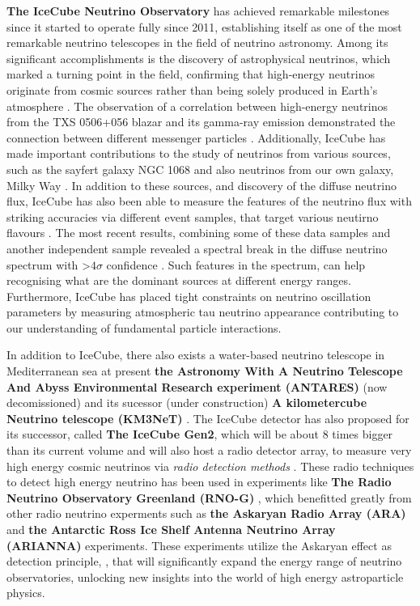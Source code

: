 \textbf{The IceCube Neutrino Observatory} has achieved remarkable milestones since it started to operate fully since 2011, establishing itself as one of the most remarkable neutrino telescopes in the field of neutrino astronomy. Among its significant accomplishments is the discovery of astrophysical neutrinos, which marked a turning point in the field, confirming that high-energy neutrinos originate from cosmic sources rather than being solely produced in Earth's atmosphere . The observation of a correlation between high-energy neutrinos from the TXS 0506+056 blazar and its gamma-ray emission demonstrated the connection between different messenger particles \cite{txspaper}. Additionally, IceCube has made important contributions to the study of neutrinos from various sources, such as the sayfert galaxy NGC 1068  and also neutrinos from our own galaxy, Milky Way . In addition to these sources, and discovery of the diffuse neutrino flux, IceCube has also been able to measure the features of the neutrino flux with striking accuracies via different event samples, that target various neutirno flavours . The most recent results, combining some of these data samples and another independent sample revealed a spectral break in the diffuse neutrino spectrum with >$4\sigma$ confidence . Such features in the spectrum, can help recognising what are the dominant sources at different energy ranges. Furthermore, IceCube has placed tight constraints on neutrino oscillation parameters by measuring atmospheric tau neutrino appearance  contributing to our understanding of fundamental particle interactions.  

In addition to IceCube, there also exists a water-based neutrino telescope in Mediterranean sea at present \textbf{the Astronomy With A Neutrino Telescope And Abyss Environmental Research experiment (ANTARES)}  (now decomissioned) and its sucessor (under construction) \textbf{A kilometercube Neutrino telescope (KM3NeT)} . The IceCube detector has also proposed for its successor, called \textbf{The IceCube Gen2}, which will be about 8 times bigger than its current volume and will also host a radio detector array, to measure very high energy cosmic neutrinos via \emph{radio detection methods} . These radio techniques to detect high energy neutrino has been used in experiments like \textbf{The Radio Neutrino Observatory Greenland (RNO-G)} , which benefitted greatly from other radio neutrino experments such as \textbf{the Askaryan Radio Array (ARA)}  and \textbf{the Antarctic Ross Ice Shelf Antenna Neutrino Array (ARIANNA)}  experiments. These experiments utilize the Askaryan effect as detection principle, , that will significantly expand the energy range of neutrino observatories, unlocking new insights into the world of high energy astroparticle physics.

